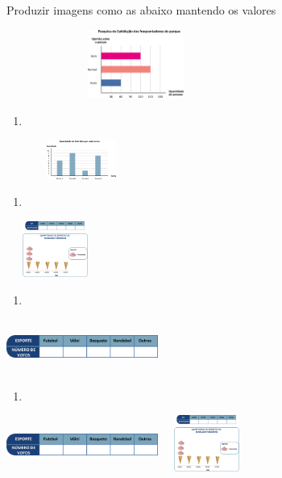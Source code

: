 Produzir imagens como as abaixo mantendo os valores

\includegraphics[width=3.34196in,height=0.88341in]{media/image82.png}

\begin{enumerate}
\def\labelenumi{\alph{enumi})}
\item
\end{enumerate}

\includegraphics[width=1.93350in,height=0.50004in]{media/image83.png}

\begin{enumerate}
\def\labelenumi{\alph{enumi})}
\item
\end{enumerate}

\includegraphics[width=1.26678in,height=0.72506in]{media/image84.png}

\begin{enumerate}
\def\labelenumi{\alph{enumi})}
\item
\end{enumerate}

\includegraphics[width=1.95850in,height=0.69173in]{media/image85.png}

\begin{enumerate}
\def\labelenumi{\alph{enumi})}
\item
\end{enumerate}

\includegraphics[width=1.95850in,height=0.69173in]{media/image85.png}\includegraphics[width=1.26678in,height=0.72506in]{media/image84.png}

